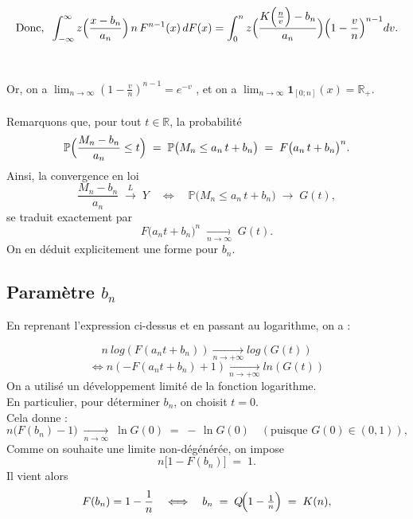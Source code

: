 \documentclass{article}
\theoremstyle{plain}
\theoremstyle{definition}
\theoremstyle{plain}
\begin{document}
\begin{equation}\label{eq:1.1}
    \text{Donc,} \; \; \int_{-\infty}^{\infty} z\Bigl(\frac{x-b_n}{a_n}\Bigr) \, n \, F^{n-1}(x)\,dF(x)
    =\int_{0}^{n} z\Bigl(\frac{K\Bigl(\frac{n}{v}\Bigr)-b_n}{a_n}\Bigr)
    \Bigl(1-\frac{v}{n}\Bigr)^{n-1}dv.
\end{equation}
\\
\\
Or, on a $\lim_{n \to \infty} ( 1 - \frac{v}{n})^{n-1} = e^{-v}$ , et on a $\lim_{n \to \infty} \mathbf{1}_{[0;n]}(x) = \mathbb{R}_{+}$.
\\
\\
Remarquons que, pour tout $t\in\mathbb R$, la probabilité
\[
\mathbb{P}  \Bigl(\frac{M_n - b_n}{a_n} \le t\Bigr)
\;=\;
\mathbb{P} \bigl(M_n \le a_n\,t + b_n\bigr)
\;=\;
F\bigl(a_n\,t + b_n\bigr)^{n}.
\]
Ainsi, la convergence en loi 
\[
\frac{M_n - b_n}{a_n}\;\overset{L}{\longrightarrow}\;Y
\quad\Longleftrightarrow\quad
\mathbb{P} \bigl(M_n \le a_n\,t + b_n\bigr)
\;\longrightarrow\;
G(t),
\]
se traduit exactement par
\[
F\bigl(a_n t + b_n\bigr)^{n}
\;\xrightarrow[n\to\infty]{}\;
G(t).
\]
On en déduit explicitement une forme pour $b_n$.

\subsection{Paramètre $b_n$}

En reprenant l'expression ci-dessus et en passant au logarithme, on a :

\[
n \: log(F(a_n t + b_n)) \xrightarrow[n\to +\infty]{} log(G(t))
\]
\[
\Longleftrightarrow n(- F(a_n t + b_n) + 1) \xrightarrow[n\to +\infty]{} ln(G(t))
\]
On a utilisé un développement limité de la fonction logarithme. 
\\
En particulier, pour déterminer \(b_n\), on choisit \(t=0\).
\\
Cela donne :
\[
n\bigl(F(b_n)-1\bigr)\;\xrightarrow[n\to\infty]{}\;\ln G(0)
\;=\;-\,\ln G(0)\quad(\text{puisque }G(0)\in(0,1)),
\]
Comme on souhaite une limite non-dégénérée, on impose
\[
n\bigl[1 - F(b_n)\bigr] \;=\; 1.
\]
Il vient alors
\[
F(b_n)=1-\frac1n
\quad\Longleftrightarrow\quad
b_n \;=\; Q\!\Bigl(1-\tfrac1n\Bigr)
\;=\;K(n),
\]
\end{document}
